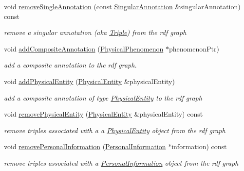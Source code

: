 \begin{DoxyCompactItemize}
void \hyperlink{classomexmeta_1_1Editor_afcb5ce7397aab23fabd3b4b4b89d3a54}{remove\+Single\+Annotation} (const \hyperlink{classomexmeta_1_1Triple}{Singular\+Annotation} \&singular\+Annotation) const
\begin{DoxyCompactList}\small\item\em remove a singular annotation (aka \hyperlink{classomexmeta_1_1Triple}{Triple}) from the rdf graph \end{DoxyCompactList}\item 
void \hyperlink{classomexmeta_1_1Editor_a146ae84fb44991d9c6135e98f03fa972}{add\+Composite\+Annotation} (\hyperlink{classomexmeta_1_1PhysicalPhenomenon}{Physical\+Phenomenon} $\ast$phenomenon\+Ptr)
\begin{DoxyCompactList}\small\item\em add a composite annotation to the rdf graph. \end{DoxyCompactList}\item 
void \hyperlink{classomexmeta_1_1Editor_a0740831baafe244374ad7a324d51a87e}{add\+Physical\+Entity} (\hyperlink{classomexmeta_1_1PhysicalEntity}{Physical\+Entity} \&physical\+Entity)
\begin{DoxyCompactList}\small\item\em add a composite annotation of type \hyperlink{classomexmeta_1_1PhysicalEntity}{Physical\+Entity} to the rdf graph \end{DoxyCompactList}\item 
void \hyperlink{classomexmeta_1_1Editor_a0acf94314252b70a4db89f83e6047e8f}{remove\+Physical\+Entity} (\hyperlink{classomexmeta_1_1PhysicalEntity}{Physical\+Entity} \&physical\+Entity) const
\begin{DoxyCompactList}\small\item\em remove triples associated with a a \hyperlink{classomexmeta_1_1PhysicalEntity}{Physical\+Entity} object from the rdf graph \end{DoxyCompactList}\item 
void \hyperlink{classomexmeta_1_1Editor_a8be7fa01bef49ff1c93965781797c9bc}{remove\+Personal\+Information} (\hyperlink{classomexmeta_1_1PersonalInformation}{Personal\+Information} $\ast$information) const
\begin{DoxyCompactList}\small\item\em remove triples associated with a \hyperlink{classomexmeta_1_1PersonalInformation}{Personal\+Information} object from the rdf graph \end{DoxyCompactList}\item 

\end{DoxyCompactItemize}
